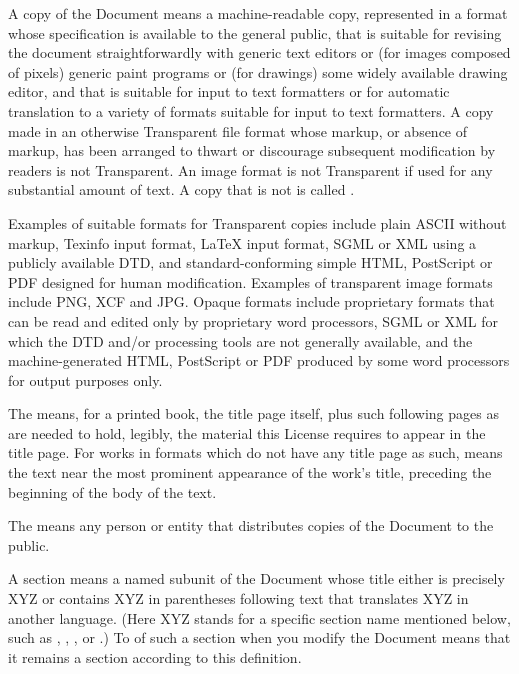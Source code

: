 A  copy of the Document means a machine-readable copy,
represented in a format whose specification is available to the
general public, that is suitable for revising the document
straightforwardly with generic text editors or (for images composed of
pixels) generic paint programs or (for drawings) some widely available
drawing editor, and that is suitable for input to text formatters or
for automatic translation to a variety of formats suitable for input
to text formatters.  A copy made in an otherwise Transparent file
format whose markup, or absence of markup, has been arranged to thwart
or discourage subsequent modification by readers is not Transparent.
An image format is not Transparent if used for any substantial amount
of text.  A copy that is not  is called .

Examples of suitable formats for Transparent copies include plain
ASCII without markup, Texinfo input format, LaTeX input format, SGML
or XML using a publicly available DTD, and standard-conforming simple
HTML, PostScript or PDF designed for human modification.  Examples of
transparent image formats include PNG, XCF and JPG.  Opaque formats
include proprietary formats that can be read and edited only by
proprietary word processors, SGML or XML for which the DTD and/or
processing tools are not generally available, and the
machine-generated HTML, PostScript or PDF produced by some word
processors for output purposes only.

The  means, for a printed book, the title page itself,
plus such following pages as are needed to hold, legibly, the material
this License requires to appear in the title page.  For works in
formats which do not have any title page as such,  means
the text near the most prominent appearance of the work's title,
preceding the beginning of the body of the text.

The  means any person or entity that distributes
copies of the Document to the public.

A section  means a named subunit of the Document whose
title either is precisely XYZ or contains XYZ in parentheses following
text that translates XYZ in another language.  (Here XYZ stands for a
specific section name mentioned below, such as ,
, , or .)
To 
of such a section when you modify the Document means that it remains a
section  according to this definition.

